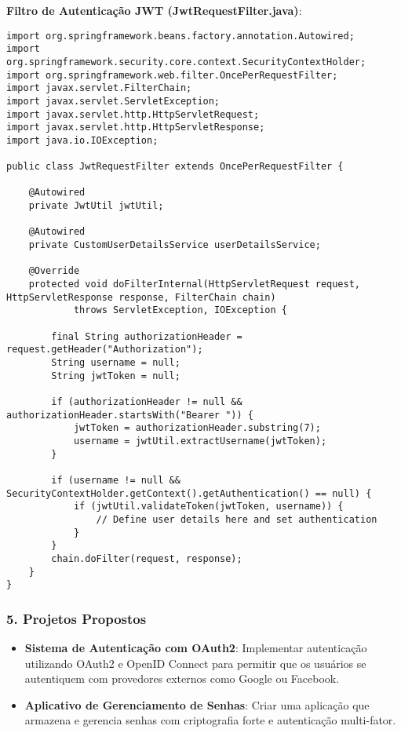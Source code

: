 \documentclass[a4paper,12pt]{book}
\begin{document}
\textbf{Filtro de Autenticação JWT (JwtRequestFilter.java)}:
\begin{verbatim}
import org.springframework.beans.factory.annotation.Autowired;
import org.springframework.security.core.context.SecurityContextHolder;
import org.springframework.web.filter.OncePerRequestFilter;
import javax.servlet.FilterChain;
import javax.servlet.ServletException;
import javax.servlet.http.HttpServletRequest;
import javax.servlet.http.HttpServletResponse;
import java.io.IOException;

public class JwtRequestFilter extends OncePerRequestFilter {

    @Autowired
    private JwtUtil jwtUtil;

    @Autowired
    private CustomUserDetailsService userDetailsService;

    @Override
    protected void doFilterInternal(HttpServletRequest request, HttpServletResponse response, FilterChain chain)
            throws ServletException, IOException {

        final String authorizationHeader = request.getHeader("Authorization");
        String username = null;
        String jwtToken = null;

        if (authorizationHeader != null && authorizationHeader.startsWith("Bearer ")) {
            jwtToken = authorizationHeader.substring(7);
            username = jwtUtil.extractUsername(jwtToken);
        }

        if (username != null && SecurityContextHolder.getContext().getAuthentication() == null) {
            if (jwtUtil.validateToken(jwtToken, username)) {
                // Define user details here and set authentication
            }
        }
        chain.doFilter(request, response);
    }
}
\end{verbatim}

\subsubsection{5. Projetos Propostos}
\begin{itemize}
    \item \textbf{Sistema de Autenticação com OAuth2}: Implementar autenticação utilizando OAuth2 e OpenID Connect para permitir que os usuários se autentiquem com provedores externos como Google ou Facebook.
    \item \textbf{Aplicativo de Gerenciamento de Senhas}: Criar uma aplicação que armazena e gerencia senhas com criptografia forte e autenticação multi-fator.
\end{itemize}
\end{document}
